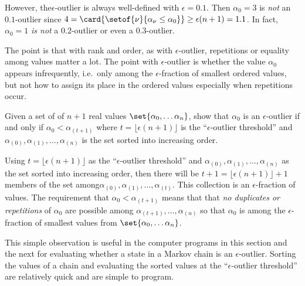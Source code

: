 \documentclass[12pt]{article}
\begin{document}
\begin{solution}
    However, the\( \epsilon \)-outlier is always well-defined with \(
    \epsilon = 0.1 \).  Then \( \alpha_0 = 3 \) is \emph{not} an \( 0.1 \)-outlier
    since \( 4 = \card{%
    \setof{\nu}{\alpha_{\nu} \le \alpha_0}} \ge \epsilon(n+1) = 1.1 \).
    In fact, \( \alpha_0 = 1 \) \emph{is not} a \( 0.2 \)-outlier or
    even a \( 0.3 \)-outlier.

    The point is that with rank and order, as with \( \epsilon \)-outlier,
    repetitions or equality among values matter a lot.  The point with \(
    \epsilon \)-outlier is whether the value \( \alpha_0 \) appears
    infrequently, i.e.\ only among the \( \epsilon \)-fraction of
    smallest ordered values, but not how to assign its place in the
    ordered values especially when repetitions occur.
\end{solution}

\begin{exercise}
  Given a set of of \( n + 1 \) real values \( \set{\alpha_0, \dots \alpha_n} \),
  show that \( \alpha_0 \) is an \( \epsilon \)-outlier if and only if
  \( \alpha_0 < \alpha_{(t + 1)} \) where \( t = \lfloor \epsilon (n +
  1) \rfloor \) is the ``\( \epsilon \)-outlier threshold'' and \(
  \alpha_{(0)}, \alpha_{(1)}, \dots, \alpha_{(n)} \) is the set sorted
  into increasing order.
\end{exercise}
\begin{solution}
    Using \( t = \lfloor \epsilon (n +
  1) \rfloor \) as the ``\( \epsilon \)-outlier threshold'' and \(
  \alpha_{(0)}, \alpha_{(1)}, \dots, \alpha_{(n)} \) as the set sorted
  into increasing order, then there will be \( t + 1 = \lfloor \epsilon (n +
  1) \rfloor + 1 \) members of the set among\(
  \alpha_{(0)}, \alpha_{(1)}, \dots, \alpha_{(t)} \).  This collection
  is an \( \epsilon \)-fraction of values.  The requirement
  that \( \alpha_0 < \alpha_{(t + 1)} \) means that that \emph{ no duplicates or
  repetitions} of \( \alpha_0 \) are possible among \(
  \alpha_{(t+1)}, \dots, \alpha_{(n)} \) so that \( \alpha_0 \) is
  among the \( \epsilon \)-fraction of smallest values from
  \( \set{\alpha_0, \dots \alpha_n} \).

  This simple observation is useful in the computer programs in this
  section and the next for evaluating whether a state in a Markov
  chain is an \( \epsilon \)-outlier.  Sorting the values of a chain
  and evaluating the sorted values at the ``\( \epsilon \)-outlier
  threshold'' are relatively quick and are simple to program.
\end{solution}
\end{document}
